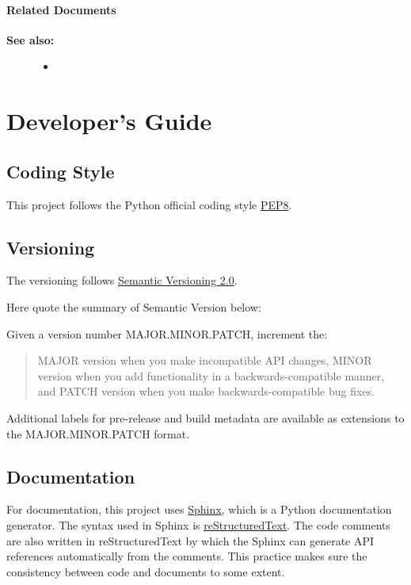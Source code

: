 \documentclass[letterpaper,10pt,english]{sphinxmanual}
\begin{document}
\subsubsection{Related Documents}
\label{user_guide:id4}\begin{description}
\item[{\textbf{See also:}}] \leavevmode\begin{itemize}
\item {} 

\end{itemize}

\end{description}


\chapter{Developer's Guide}
\label{index:developer-s-guide}

\section{Coding Style}
\label{developer_guide:coding-style}\label{developer_guide::doc}\label{developer_guide:developer-guide}
This project follows the Python official coding style \href{http://legacy.python.org/dev/peps/pep-0008/}{PEP8}.


\section{Versioning}
\label{developer_guide:pep8}\label{developer_guide:versioning}
The versioning follows \href{http://semver.org/}{Semantic Versioning 2.0}.

Here quote the summary of Semantic Version below:

Given a version number MAJOR.MINOR.PATCH, increment the:
\begin{quote}

MAJOR version when you make incompatible API changes,
MINOR version when you add functionality in a backwards-compatible manner, and
PATCH version when you make backwards-compatible bug fixes.
\end{quote}

Additional labels for pre-release and build metadata are available as extensions to the MAJOR.MINOR.PATCH format.


\section{Documentation}
\label{developer_guide:documentation}
For documentation, this project uses \href{http://sphinx-doc.org/}{Sphinx}, which is a Python documentation generator.
The syntax used in Sphinx is \href{http://docutils.sourceforge.net/rst.html}{reStructuredText}.
The code comments are also written in reStructuredText by which the Sphinx can generate API references automatically from the comments. This practice makes sure the consistency between code and documents to some extent.
\end{document}
